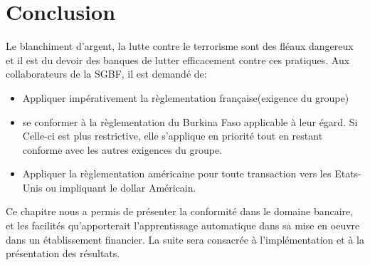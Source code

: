 

\section*{Conclusion}
Le blanchiment d'argent, la lutte contre le terrorisme sont des fléaux dangereux
et il est du devoir des banques de lutter efficacement contre ces pratiques. Aux
collaborateurs de la SGBF, il est demandé de:
\begin{itemize}
  \item Appliquer impérativement la règlementation française(exigence du groupe)
  \item se conformer à la règlementation du Burkina Faso applicable à leur
    égard. Si Celle-ci est plus restrictive, elle s'applique en priorité tout en
    restant conforme avec les autres exigences du groupe.
  \item Appliquer la règlementation américaine pour toute
    transaction vers les Etats-Unis ou impliquant le dollar Américain.
\end{itemize}

Ce chapitre nous a permis de présenter la conformité dans le domaine bancaire,
et les facilités qu'apporterait l'apprentissage automatique dans sa mise en 
oeuvre dans un établissement financier. La suite sera
consacrée à l'implémentation et à la présentation des résultats.

